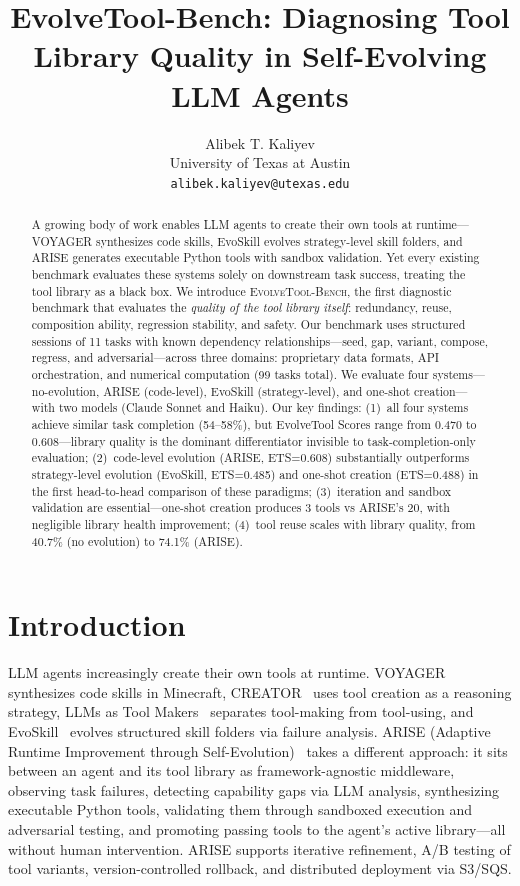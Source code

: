 \documentclass[10pt,twocolumn]{article}
\title{\textbf{EvolveTool-Bench}: Diagnosing Tool Library Quality in Self-Evolving LLM Agents}
\author{Alibek T. Kaliyev\\
University of Texas at Austin\\
\texttt{alibek.kaliyev@utexas.edu}}
\date{}
\begin{document}
\maketitle

\begin{abstract}
A growing body of work enables LLM agents to create their own tools at runtime---VOYAGER synthesizes code skills, EvoSkill evolves strategy-level skill folders, and ARISE generates executable Python tools with sandbox validation. Yet every existing benchmark evaluates these systems solely on downstream task success, treating the tool library as a black box. We introduce \textsc{EvolveTool-Bench}, the first diagnostic benchmark that evaluates the \emph{quality of the tool library itself}: redundancy, reuse, composition ability, regression stability, and safety. Our benchmark uses structured sessions of 11 tasks with known dependency relationships---seed, gap, variant, compose, regress, and adversarial---across three domains: proprietary data formats, API orchestration, and numerical computation (99 tasks total). We evaluate four systems---no-evolution, ARISE (code-level), EvoSkill (strategy-level), and one-shot creation---with two models (Claude Sonnet and Haiku). Our key findings: (1)~all four systems achieve similar task completion (54--58\%), but EvolveTool Scores range from 0.470 to 0.608---library quality is the dominant differentiator invisible to task-completion-only evaluation; (2)~code-level evolution (ARISE, ETS=0.608) substantially outperforms strategy-level evolution (EvoSkill, ETS=0.485) and one-shot creation (ETS=0.488) in the first head-to-head comparison of these paradigms; (3)~iteration and sandbox validation are essential---one-shot creation produces 3 tools vs ARISE's 20, with negligible library health improvement; (4)~tool reuse scales with library quality, from 40.7\% (no evolution) to 74.1\% (ARISE).
\end{abstract}

\section{Introduction}

LLM agents increasingly create their own tools at runtime. VOYAGER~\cite{wang2023voyager} synthesizes code skills in Minecraft, CREATOR~\cite{qian2023creator} uses tool creation as a reasoning strategy, LLMs as Tool Makers~\cite{cai2023latm} separates tool-making from tool-using, and EvoSkill~\cite{alzubi2026evoskill} evolves structured skill folders via failure analysis. ARISE (Adaptive Runtime Improvement through Self-Evolution)~\cite{kaliyev2026arise} takes a different approach: it sits between an agent and its tool library as framework-agnostic middleware, observing task failures, detecting capability gaps via LLM analysis, synthesizing executable Python tools, validating them through sandboxed execution and adversarial testing, and promoting passing tools to the agent's active library---all without human intervention. ARISE supports iterative refinement, A/B testing of tool variants, version-controlled rollback, and distributed deployment via S3/SQS.
\end{document}
